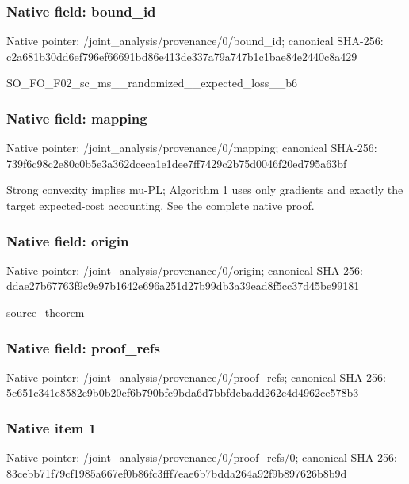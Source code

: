 \documentclass[10pt,a4paper]{article}
\begin{document}
\subsubsection{Native field: bound\_\allowbreak{}id}
Native pointer: /joint\_\allowbreak{}analysis/provenance/0/bound\_\allowbreak{}id; canonical SHA-256: c2a681b30dd6ef796ef66691bd86e413de337a79a747b1c1bae84e2440c8a429

\begingroup\raggedright\sloppy SO\_\allowbreak{}FO\_\allowbreak{}F02\_\allowbreak{}sc\_\allowbreak{}ms\_\allowbreak{}\_\allowbreak{}randomized\_\allowbreak{}\_\allowbreak{}expected\_\allowbreak{}loss\_\allowbreak{}\_\allowbreak{}b6\par\endgroup

\subsubsection{Native field: mapping}
Native pointer: /joint\_\allowbreak{}analysis/provenance/0/mapping; canonical SHA-256: 739f6c98c2e80c0b5e3a362dceca1e1dee7ff7429c2b75d0046f20ed795a63bf

\begingroup\raggedright\sloppy Strong convexity implies mu-PL;\allowbreak{} Algorithm 1 uses only gradients and exactly the target expected-cost accounting. See the complete native proof.\par\endgroup

\subsubsection{Native field: origin}
Native pointer: /joint\_\allowbreak{}analysis/provenance/0/origin; canonical SHA-256: ddae27b67763f9c9e97b1642e696a251d27b99db3a39ead8f5cc37d45be99181

\begingroup\raggedright\sloppy source\_\allowbreak{}theorem\par\endgroup

\subsubsection{Native field: proof\_\allowbreak{}refs}
Native pointer: /joint\_\allowbreak{}analysis/provenance/0/proof\_\allowbreak{}refs; canonical SHA-256: 5c651c341e8582e9b0b20cf6b790bfc9bda6d7bbfdcbadd262c4d4962ce578b3

\subsubsection{Native item 1}
Native pointer: /joint\_\allowbreak{}analysis/provenance/0/proof\_\allowbreak{}refs/0; canonical SHA-256: 83cebb71f79cf1985a667ef0b86fc3fff7eae6b7bdda264a92f9b897626b8b9d
\end{document}
